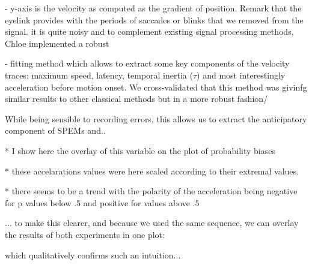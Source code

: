 \documentclass[profile,final,english, draft]{article}%
\begin{document}
- y-axis is the velocity as computed as the gradient of position. Remark that the eyelink provides with the periods of saccades or blinks that we removed from the signal. it is quite noisy and to complement existing signal processing methods, Chloe implemented a robust

- fitting method which allows to extract some key components of the velocity traces: maximum speed, latency, temporal inertia ($\tau$) and most interestingly acceleration before motion onset. We cross-validated that this method was givinfg similar results to other classical methods but in a more robust fashion/

While being sensible to recording errors, this allows us to extract the anticipatory component of SPEMs and..


 * I show here the overlay of this variable on the plot of probability biases

 * these accelarations values were here scaled according to their extremal values.

 * there seems to be a trend with the polarity of the acceleration being negative for p values below .5 and positive for values above .5

... to make this clearer, and because we used the same sequence, we can overlay the results of both experiments in one plot:

which qualitatively confirms such an intuition...




\end{document}
